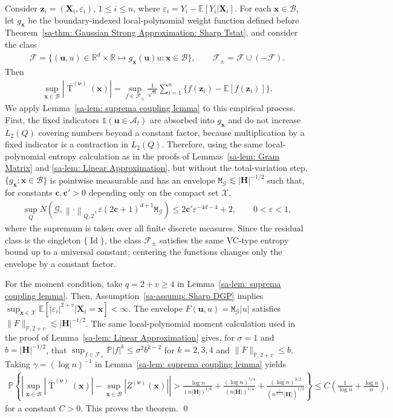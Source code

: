 \documentclass[10pt]{article}
\DeclareMathOperator{\Tstat}{T}
\renewcommand{\P}{\mathbb{P}}
\newcommand{\E}{\mathbb{E}}
\newcommand{\Indicator}{\mathds{1}}
\newcommand{\reals}{\mathbb{R}}
\newcommand{\norm}[1]{\left\lVert#1\right\rVert}
\newcommand{\bc}{\mathbf{c}}
\newcommand{\bH}{\mathbf{H}}
\newcommand{\bu}{\mathbf{u}}
\newcommand{\bx}{\mathbf{x}}
\newcommand{\bX}{\mathbf{X}}
\newcommand{\bz}{\mathbf{z}}
\newcommand{\bnu}{\boldsymbol{\nu}}
\newcommand{\A}{\mathcal{A}}
\newcommand{\B}{\mathcal{B}}
\newcommand{\F}{\mathcal{F}}
\newcommand{\G}{\mathcal{G}}
\newcommand{\X}{\mathcal{X}}
\newcommand{\ttM}{\mathtt{M}}
\begin{document}
Consider $\bz_i=(\bX_i,\varepsilon_i)$, $1\leq i\leq n$, where $\varepsilon_i=Y_i-\E[Y_i|\bX_i]$. For each $\bx\in\B$, let $g_{\bx}$ be the boundary-indexed local-polynomial weight function defined before Theorem~\ref{sa-thm: Gaussian Strong Approximation: Sharp Tstat}, and consider the class
\begin{align*}
    \F=\{(\bu,u)\in\reals^d\times\reals\mapsto g_{\bx}(\bu)u:\bx\in\B\},
    \qquad
    \F_{\pm}=\F\cup(-\F).
\end{align*}
Then
\begin{align*}
    \sup_{\bx\in\B}|\overline{\Tstat}^{(\bnu)}(\bx)|
    =
    \sup_{f\in\F_{\pm}}
    \frac{1}{\sqrt n}\sum_{i=1}^n\{f(\bz_i)-\E[f(\bz_i)]\}.
\end{align*}
We apply Lemma~\ref{sa-lem: suprema coupling lemma} to this empirical process. First, the fixed indicators $\Indicator(\bu\in\A_t)$ are absorbed into $g_{\bx}$ and do not increase $L_2(Q)$ covering numbers beyond a constant factor, because multiplication by a fixed indicator is a contraction in $L_2(Q)$. Therefore, using the same local-polynomial entropy calculation as in the proofs of Lemmas~\ref{sa-lem: Gram Matrix} and \ref{sa-lem: Linear Approximation}, but without the total-variation step, $\{g_{\bx}:\bx\in\B\}$ is pointwise measurable and has an envelope $\ttM_{\G}\lesssim|\bH|^{-1/2}$ such that, for constants $\bc,\bc'>0$ depending only on the compact set $\X$,
\begin{align*}
    \sup_Q N(\G,\norm{\cdot}_{Q,2},\varepsilon(2\bc+1)^{d+1}\ttM_{\G})
    \leq 2\bc'\varepsilon^{-4d-4}+2,
    \qquad 0<\varepsilon<1,
\end{align*}
where the supremum is taken over all finite discrete measures. Since the residual class is the singleton $\{\operatorname{Id}\}$, the class $\F_{\pm}$ satisfies the same VC-type entropy bound up to a universal constant; centering the functions changes only the envelope by a constant factor.

For the moment condition, take $q=2+v\geq4$ in Lemma~\ref{sa-lem: suprema coupling lemma}. Then, Assumption~\ref{sa-assump: Sharp DGP} implies $\sup_{\bx\in\X}\E[|\varepsilon_i|^{2+v}|\bX_i=\bx]<\infty$. The envelope $F(\bu,u)=\ttM_{\G}|u|$ satisfies $\|F\|_{\P,2+v}\lesssim|\bH|^{-1/2}$. The same local-polynomial moment calculation used in the proof of Lemma~\ref{sa-lem: Linear Approximation} gives, for $\sigma=1$ and $b=|\bH|^{-1/2}$, that $\sup_{f\in\F_{\pm}}\P|f|^k\leq\sigma^2b^{k-2}$ for $k=2,3,4$ and $\|F\|_{\P,2+v}\leq b$. Taking $\gamma=(\log n)^{-1}$ in Lemma~\ref{sa-lem: suprema coupling lemma} yields
\begin{align*}
    \P\left\{ \left|\sup_{\bx\in\B}|\overline{\Tstat}^{(\bnu)}(\bx)|-\sup_{\bx\in\B}|Z^{(\bnu)}(\bx)|\right|>
    \frac{\log n}{(n|\bH|)^{1/6}}
    +\frac{(\log n)^{5/4}}{(n|\bH|)^{1/4}}
    +\frac{(\log n)^{3/2}}{(n^{\frac{v}{2+v}}|\bH|)^{1/2}}
    \right\}
    \leq C\left(\frac{1}{\log n}+\frac{\log n}{n}\right),
\end{align*}
for a constant $C>0$. This proves the theorem.
\qed
\end{document}
